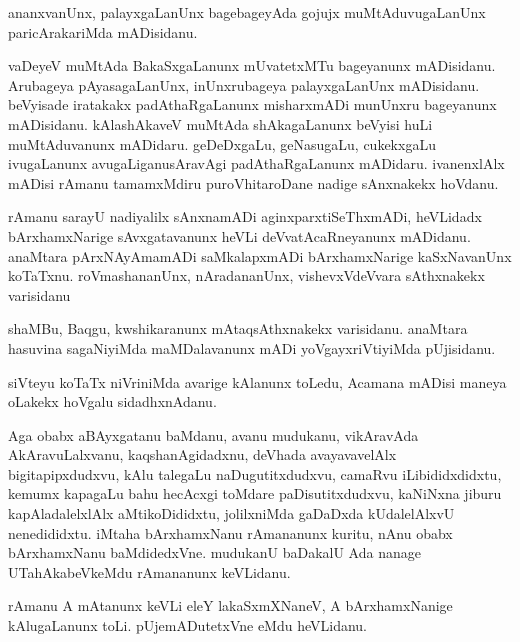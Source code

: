 \documentclass{article}
\begin{document}
\begin{mn}
ananxvanUnx,  palayxgaLanUnx  bagebageyAda  gojujx  muMtAduvugaLanUnx  paricArakariMda  mADisidanu.  
\end{mn}

\begin{mn}
vaDeyeV  muMtAda  BakaSxgaLanunx  mUvatetxMTu  bageyanunx  mADisidanu.  Arubageya  pAyasagaLanUnx,  inUnxrubageya  palayxgaLanUnx  
mADisidanu.  beVyisade  iratakakx  padAthaRgaLanunx  misharxmADi  munUnxru  bageyanunx  mADisidanu.  kAlashAkaveV  muMtAda  
shAkagaLanunx  beVyisi  huLi  muMtAduvanunx  mADidaru.  geDeDxgaLu,  geNasugaLu,  cukekxgaLu  ivugaLanunx  avugaLiganusAravAgi  
padAthaRgaLanunx  mADidaru.  ivanenxlAlx  mADisi  rAmanu  tamamxMdiru  puroVhitaroDane  nadige  sAnxnakekx  hoVdanu.
\end{mn}

\begin{mn}
rAmanu  sarayU  nadiyalilx  sAnxnamADi  aginxparxtiSeThxmADi,  heVLidadx  bArxhamxNarige  sAvxgatavanunx  heVLi  deVvatAcaRneyanunx  
mADidanu.  anaMtara  pArxNAyAmamADi  saMkalapxmADi  bArxhamxNarige  kaSxNavanUnx  koTaTxnu.  roVmashananUnx,  nAradananUnx,  
vishevxVdeVvara  sAthxnakekx  varisidanu
\end{mn}

\begin{mn}
shaMBu,  Baqgu,  kwshikaranunx  mAtaqsAthxnakekx  varisidanu.  anaMtara  hasuvina  sagaNiyiMda  maMDalavanunx  mADi  yoVgayxriVtiyiMda  pUjisidanu.
\end{mn}

\begin{mn}
siVteyu  koTaTx  niVriniMda  avarige  kAlanunx  toLedu,  Acamana  mADisi  maneya  oLakekx  hoVgalu  sidadhxnAdanu.
\end{mn}

\begin{mn}
Aga  obabx  aBAyxgatanu  baMdanu,  avanu  mudukanu,  vikAravAda  AkAravuLalxvanu,  kaqshanAgidadxnu,  deVhada  avayavavelAlx  bigitapipxdudxvu,  
kAlu  talegaLu  naDugutitxdudxvu,  camaRvu  iLibididxdidxtu,  kemumx  kapagaLu  bahu hecAcxgi  toMdare paDisutitxdudxvu,  kaNiNxna  jiburu  
kapAladalelxlAlx  aMtikoDididxtu,  jolilxniMda  gaDaDxda  kUdalelAlxvU  nenedididxtu.  iMtaha  bArxhamxNanu  rAmananunx  kuritu,  nAnu  obabx  
bArxhamxNanu  baMdidedxVne.  mudukanU  baDakalU  Ada  nanage  UTahAkabeVkeMdu  rAmananunx  keVLidanu.
\end{mn}

\begin{mn}
rAmanu  A  mAtanunx  keVLi  eleY  lakaSxmXNaneV,  A  bArxhamxNanige  kAlugaLanunx  toLi.  pUjemADutetxVne  eMdu  heVLidanu.
\end{mn}
\end{document}

